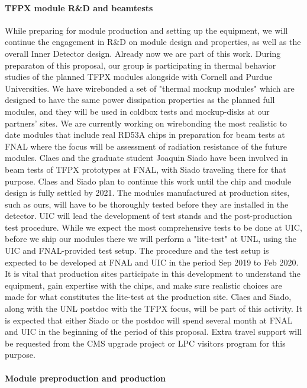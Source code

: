 \paragraph{TFPX module R\&D and beamtests}
While preparing for module production and setting up the equipment, we will continue the engagement in R\&D on module design and properties, as well as the overall Inner Detector design. Already now we are part of this work. During preparaton of this proposal, our group is participating in thermal behavior studies of the planned TFPX modules alongside with Cornell and Purdue Universities. We have wirebonded a set of "thermal mockup modules" which are designed to have the same power dissipation properties as the planned full modules, and they will be used in coldbox tests and mockup-disks at our partners' sites. We are currently working on wirebonding the most realistic to date modules that include real RD53A chips in preparation for beam tests at FNAL where the focus will be assessment of radiation resistance of the future modules. Claes and the graduate student Joaquin Siado have been involved in beam tests of TFPX prototypes at FNAL, with Siado traveling there for that purpose. Claes and Siado plan to continue this work until the chip and module design is fully settled by 2021. The modules manufactured at production sites, such as ours, will have to be thoroughly tested before they are installed in the detector. UIC will lead the development of test stands and the post-production test procedure. While we expect the most comprehensive tests to be done at UIC, before we ship our modules there we will perform a "lite-test" at UNL, using the UIC and FNAL-provided test setup. The procedure and the test setup is expected to be developed at FNAL and UIC in the period Sep 2019 to Feb 2020. It is vital that production sites participate in this development to understand the equipment, gain expertise with the chips, and make sure realistic choices are made for what constitutes the lite-test at the production site. Claes and Siado, along with the UNL postdoc with the TFPX focus, will be part of this activity. It is expected that either Siado or the postdoc will spend several month at FNAL and UIC in the beginning of the period of this proposal. Extra travel support will be requested from the CMS upgrade project or LPC visitors program for this purpose.

\paragraph{Module preproduction and production}

